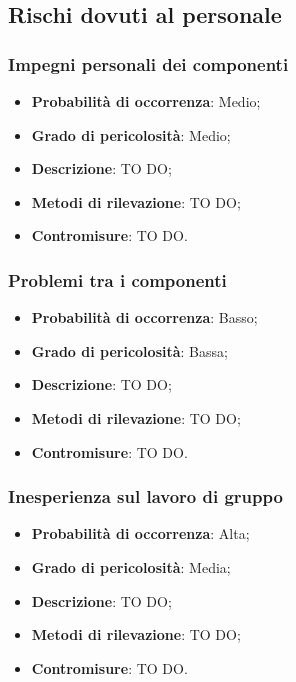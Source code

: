 	
	\subsection{Rischi dovuti al personale} %
	\label{sub:rischi_dovuti_al_personale}
		\subsubsection{Impegni personali dei componenti} %
		\label{ssub:impegni_personali_dei_componenti}
			\begin{itemize}
				\item \textbf{Probabilità di occorrenza}: Medio;
				\item \textbf{Grado di pericolosità}: Medio;
				\item \textbf{Descrizione}: TO DO;
				\item \textbf{Metodi di rilevazione}: TO DO;
				\item \textbf{Contromisure}: TO DO.
			\end{itemize}
		
		\subsubsection{Problemi tra i componenti} %
		\label{ssub:problemi_tra_i_componenti}
			\begin{itemize}
				\item \textbf{Probabilità di occorrenza}: Basso;
				\item \textbf{Grado di pericolosità}: Bassa;
				\item \textbf{Descrizione}: TO DO;
				\item \textbf{Metodi di rilevazione}: TO DO;
				\item \textbf{Contromisure}: TO DO.
			\end{itemize}
		
		\subsubsection{Inesperienza sul lavoro di gruppo} %
		\label{ssub:inesperienza_su_lavoro_di_gruppo}
			\begin{itemize}
				\item \textbf{Probabilità di occorrenza}: Alta;
				\item \textbf{Grado di pericolosità}: Media;
				\item \textbf{Descrizione}: TO DO;
				\item \textbf{Metodi di rilevazione}: TO DO;
				\item \textbf{Contromisure}: TO DO.
			\end{itemize}
		
